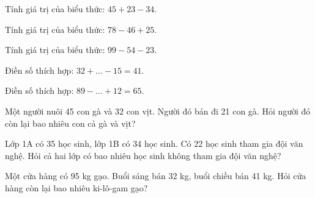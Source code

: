 \begin{ex}
Tính giá trị của biểu thức: $45 + 23 - 34$.
\end{ex}

\begin{ex}
Tính giá trị của biểu thức: $78 - 46 + 25$.
\end{ex}

\begin{ex}
Tính giá trị của biểu thức: $99 - 54 - 23$.
\end{ex}

\begin{ex}
Điền số thích hợp: $32 + \dots - 15 = 41$.
\end{ex}

\begin{ex}
Điền số thích hợp: $89 - \dots + 12 = 65$.
\end{ex}

\begin{ex}
Một người nuôi 45 con gà và 32 con vịt. Người đó bán đi 21 con gà. Hỏi người đó còn lại bao nhiêu con cả gà và vịt?
\end{ex}

\begin{ex}
Lớp 1A có 35 học sinh, lớp 1B có 34 học sinh. Có 22 học sinh tham gia đội văn nghệ. Hỏi cả hai lớp có bao nhiêu học sinh không tham gia đội văn nghệ?
\end{ex}

\begin{ex}
Một cửa hàng có 95 kg gạo. Buổi sáng bán 32 kg, buổi chiều bán 41 kg. Hỏi cửa hàng còn lại bao nhiêu ki-lô-gam gạo?
\end{ex}

